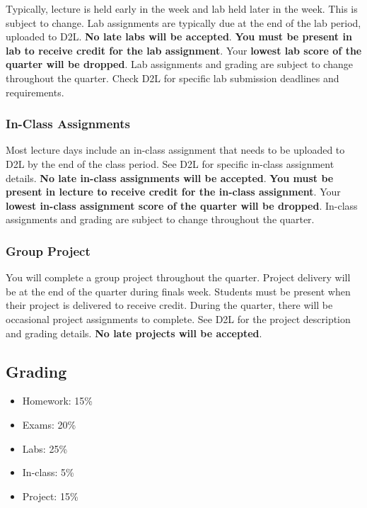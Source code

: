 \documentclass[11pt]{article}
\providecommand{\tightlist}{%
      \setlength{\itemsep}{0pt}\setlength{\parskip}{0pt}}
\begin{document}
Typically, lecture is held early in the week and lab held later in the
week. This is subject to change. Lab assignments are typically due at
the end of the lab period, uploaded to D2L. \textbf{No late labs will be
accepted}. \textbf{You must be present in lab to receive credit for the
lab assignment}. Your \textbf{lowest lab score of the quarter will be
dropped}. Lab assignments and grading are subject to change throughout
the quarter. Check D2L for specific lab submission deadlines and
requirements.

    \hypertarget{in-class-assignments}{%
\subsubsection{In-Class Assignments}\label{in-class-assignments}}

Most lecture days include an in-class assignment that needs to be
uploaded to D2L by the end of the class period. See D2L for specific
in-class assignment details. \textbf{No late in-class assignments will
be accepted}. \textbf{You must be present in lecture to receive credit
for the in-class assignment}. Your \textbf{lowest in-class assignment
score of the quarter will be dropped}. In-class assignments and grading
are subject to change throughout the quarter.

    \hypertarget{group-project}{%
\subsubsection{Group Project}\label{group-project}}

You will complete a group project throughout the quarter. Project
delivery will be at the end of the quarter during finals week. Students
must be present when their project is delivered to receive credit.
During the quarter, there will be occasional project assignments to
complete. See D2L for the project description and grading details.
\textbf{No late projects will be accepted}.

    \hypertarget{grading}{%
\subsection{Grading}\label{grading}}

\begin{itemize}
\tightlist
\item
  Homework: 15\%
\item
  Exams: 20\%
\item
  Labs: 25\%
\item
  In-class: 5\%
\item
  Project: 15\%
\end{itemize}
\end{document}
